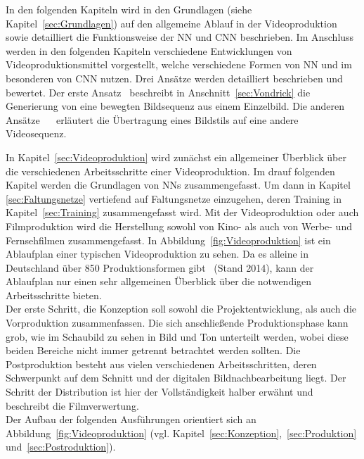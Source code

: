 \documentclass[times, 11pt,twocolumn]{article}
\begin{document}
In den folgenden Kapiteln wird in den Grundlagen (siehe Kapitel~\ref{sec:Grundlagen}) auf den allgemeine Ablauf in der Videoproduktion sowie detailliert die Funktionsweise der NN und CNN beschrieben. Im Anschluss werden in den folgenden Kapiteln verschiedene Entwicklungen von Videoproduktionsmittel vorgestellt, welche verschiedene Formen von NN und im besonderen von CNN nutzen. Drei Ansätze werden detailliert beschrieben und bewertet. Der erste Ansatz~\cite{Vondrick} beschreibt in Anschnitt~\ref{sec:Vondrick} die Generierung von eine bewegten Bildsequenz aus einem Einzelbild. Die anderen Ansätze~ \cite{DeepDream}~\cite{GatysEB15a} erläutert die Übertragung eines Bildstils auf eine andere Videosequenz.


 \label{sec:Grundlagen}
In Kapitel~\ref{sec:Videoproduktion} wird zunächst ein allgemeiner Überblick über die verschiedenen Arbeitsschritte einer Videoproduktion. Im drauf folgenden Kapitel werden die Grundlagen von NNs zusammengefasst. Um dann in Kapitel \ref{sec:Faltungsnetze} vertiefend auf Faltungsnetze einzugehen, deren Training in Kapitel~\ref{sec:Training} zusammengefasst wird. 
 \label{sec:Videoproduktion}
Mit der Videoproduktion oder auch Filmproduktion wird die Herstellung sowohl von Kino- als auch von Werbe- und Fernsehfilmen zusammengefasst. In Abbildung~\ref{fig:Videoproduktion} ist ein Ablaufplan einer typischen Videoproduktion zu sehen. Da es alleine in Deutschland über 850 Produktionsformen gibt~\cite{formatt} (Stand 2014), kann der Ablaufplan nur einen sehr allgemeinen Überblick über die notwendigen Arbeitsschritte bieten. \\
Der erste Schritt, die Konzeption soll sowohl die Projektentwicklung, als auch die Vorproduktion zusammenfassen. Die sich anschließende Produktionsphase kann grob, wie im Schaubild zu sehen in Bild und Ton unterteilt werden, wobei diese beiden Bereiche nicht immer getrennt betrachtet werden sollten. Die Postproduktion besteht aus vielen verschiedenen Arbeitsschritten, deren Schwerpunkt auf dem Schnitt und der digitalen Bildnachbearbeitung liegt. Der Schritt der Distribution ist hier der Vollständigkeit halber erwähnt und beschreibt die Filmverwertung. \\

Der Aufbau der folgenden Ausführungen orientiert sich an Abbildung~\ref{fig:Videoproduktion} (vgl. Kapitel~\ref{sec:Konzeption},~\ref{sec:Produktion} und~\ref{sec:Postroduktion}).
\end{document}
